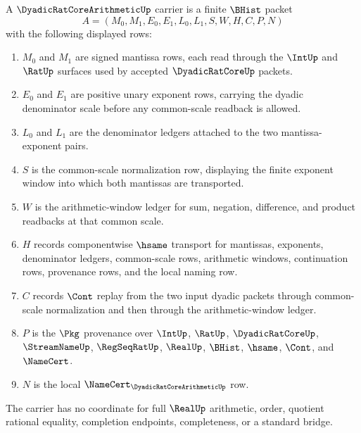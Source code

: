 \begin{definition}
\label{def:dyadic-rat-core-arithmetic-carrier}
A $\DyadicRatCoreArithmeticUp$ carrier is a finite $\BHist$ packet
$$
A=(M_0,M_1,E_0,E_1,L_0,L_1,S,W,H,C,P,N)
$$
with the following displayed rows:
\begin{enumerate}
\item $M_0$ and $M_1$ are signed mantissa rows, each read through the $\IntUp$ and $\RatUp$ surfaces used by accepted $\DyadicRatCoreUp$ packets.
\item $E_0$ and $E_1$ are positive unary exponent rows, carrying the dyadic denominator scale before any common-scale readback is allowed.
\item $L_0$ and $L_1$ are the denominator ledgers attached to the two mantissa-exponent pairs.
\item $S$ is the common-scale normalization row, displaying the finite exponent window into which both mantissas are transported.
\item $W$ is the arithmetic-window ledger for sum, negation, difference, and product readbacks at that common scale.
\item $H$ records componentwise $\hsame$ transport for mantissas, exponents, denominator ledgers, common-scale rows, arithmetic windows, continuation rows, provenance rows, and the local naming row.
\item $C$ records $\Cont$ replay from the two input dyadic packets through common-scale normalization and then through the arithmetic-window ledger.
\item $P$ is the $\Pkg$ provenance over $\IntUp$, $\RatUp$, $\DyadicRatCoreUp$, $\StreamNameUp$, $\RegSeqRatUp$, $\RealUp$, $\BHist$, $\hsame$, $\Cont$, and $\NameCert$.
\item $N$ is the local $\NameCert_{\DyadicRatCoreArithmeticUp}$ row.
\end{enumerate}
The carrier has no coordinate for full $\RealUp$ arithmetic, order, quotient rational equality, completion endpoints, completeness, or a standard bridge.
\end{definition}

